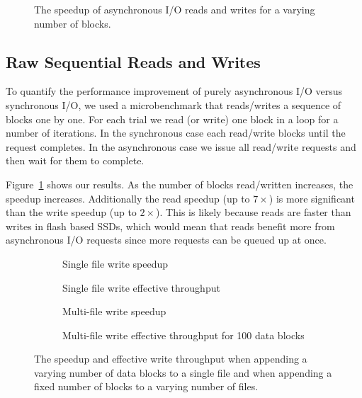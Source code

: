 \begin{figure}
  \centering
  
  \caption{The speedup of asynchronous I/O reads and writes for a varying
    number of blocks.}\label{fig:raw-speedup}
\end{figure}

\subsection{Raw Sequential Reads and Writes}
To quantify the performance improvement of purely asynchronous I/O versus
synchronous I/O, we used a microbenchmark that reads/writes a sequence of
blocks one by one. For each trial we read (or write) one block in a loop for a
number of iterations. In the synchronous case each read/write blocks until the
request completes. In the asynchronous case we issue all read/write requests
and then wait for them to complete.

Figure~\ref{fig:raw-speedup} shows our results. As the number of blocks
read/written increases, the speedup increases. Additionally the read speedup
(up to $7\times$) is more significant than the write speedup (up to $2\times$).
This is likely because reads are faster than writes in flash based SSDs, which
would mean that reads benefit more from asynchronous I/O requests since more
requests can be queued up at once.

\begin{figure*}
\centering
\begin{subfigure}[t]{0.49\linewidth}
  
  \caption{Single file write speedup}\label{fig:single-file-speedup}
\end{subfigure}\hfill%
\begin{subfigure}[t]{0.49\linewidth}
  
  \caption{Single file write effective throughput}\label{fig:single-file-thpt}
\end{subfigure}
\par\bigskip
\begin{subfigure}[t]{0.49\linewidth}
  
  \caption{Multi-file write speedup}\label{fig:multi-file-speedup}
\end{subfigure}%
\begin{subfigure}[t]{0.49\linewidth}
  
  \caption{Multi-file write effective throughput for 100 data blocks}
  \label{fig:multi-file-thpt}
\end{subfigure}
\caption{The speedup and effective write throughput when appending a varying
number of data blocks to a single file and when appending a fixed number of
blocks to a varying number of files.}
\end{figure*}

